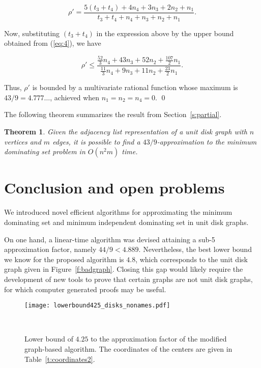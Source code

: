 \documentclass[preprint,12pt]{elsarticle}
\newtheorem{thm}{Theorem}
\begin{document}
\begin{pf}
$$\rho' = \frac{5 (t_3 + t_4) + 4 n_4 + 3 n_3 + 2 n_2 + n_1}{t_3 + t_4 + n_4 + n_3 + n_2 + n_1}.$$

Now, substituting $(t_3 + t_4)$ in the expression above by the upper bound obtained from (\ref{eq:4}), we have

$$\rho' \leq \frac{\frac{52}{3} n_4 + 43 n_3 + 52 n_2 + \frac{107}{2} n_1}{\frac{11}{3} n_4 + 9 n_3 + 11 n_2 + \frac{23}{2} n_1}.$$

Thus, $\rho'$ is bounded by a multivariate rational function whose maximum is $43/9 = 4{.}777\ldots$, achieved when $n_1=n_2=n_4 = 0$. 
\qed


\end{pf}

The following theorem summarizes the result from Section~\ref{s:partial}.

\begin{thm} \label{thm:graph-alg-partial}
Given the adjacency list representation of a unit disk graph with $n$ vertices and $m$ edges, it is possible to find a $43/9$-approximation to the minimum dominating set problem in $O(n^2 m)$ time.
\end{thm}


\section{Conclusion and open problems} \label{s:conclusion}

We introduced novel efficient algorithms for approximating the minimum dominating set and minimum independent dominating set in unit disk graphs.

On one hand, a linear-time algorithm was devised attaining a sub-5 approximation factor, namely $44/9 < 4{.}889.$ Nevertheless, the best lower bound we know for the proposed algorithm is $4{.}8$, which corresponds to the unit disk graph given in Figure~\ref{f:badgraph}.
Closing this gap would likely require the development of new tools to prove that certain graphs are not unit disk graphs, for which computer generated proofs may be useful.

\begin{figure}[t!]
 \centering
 \texttt{[image: lowerbound425\_disks\_nonames.pdf]}
 \caption{\label{f:lowerbound425}Lower bound of $4{.}25$ to the approximation factor of the modified graph-based algorithm. The coordinates of the centers are given in Table~\ref{t:coordinates2}.}  
\bigskip
~
\end{figure}
\end{document}
